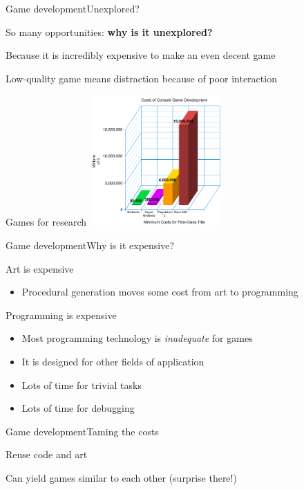 \documentclass{beamer}
\begin{document}
\begin{slide}{Game development}{Unexplored?}{
\item So many opportunities: \textbf{why is it unexplored?}
\pause
\item Because it is incredibly expensive to make an even decent game \item Low-quality game means distraction because of poor interaction
}\end{slide}

\begin{frame}{Games for research}
\center
\includegraphics[height=5cm]{Pics/game_development_costs.png}
\end{frame}

\begin{slide}{Game development}{Why is it expensive?}{
\item Art is expensive
\begin{itemize}
\item Procedural generation \cite{PROCEDURAL_GENERATION} moves some cost from art to programming
\end{itemize}
\item Programming is expensive
\begin{itemize}
\item Most programming technology is \textit{inadequate} for games
\item It is designed for other fields of application
\item Lots of time for trivial tasks
\item Lots of time for debugging
\end{itemize}
}\end{slide}

\begin{slide}{Game development}{Taming the costs}{
\item Reuse code and art
\item Can yield games similar to each other (surprise there!)
}\end{slide}
\end{document}

